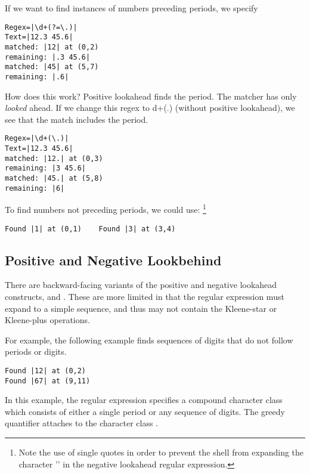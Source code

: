 If we want to find instances of numbers preceding periods, we specify
%
\begin{verbatim}
Regex=|\d+(?=\.)|
Text=|12.3 45.6|
matched: |12| at (0,2)
remaining: |.3 45.6|
matched: |45| at (5,7)
remaining: |.6|
\end{verbatim}
%
How does this work?
Positive lookahead finds the period.  The matcher has only \emph{looked} ahead.
If we change this regex to \code{\bk}d+({\bk}.) (without positive lookahead),
we see that the match includes the period.
%
\begin{verbatim}
Regex=|\d+(\.)|
Text=|12.3 45.6|
matched: |12.| at (0,3)
remaining: |3 45.6|
matched: |45.| at (5,8)
remaining: |6|
\end{verbatim}

To find numbers not preceding periods, we could use:%
%
\footnote{Note the use of single quotes in order to prevent the shell from expanding the character '\code{!}' in the negative lookahead regular expression.}
%
%
\begin{verbatim}
Found |1| at (0,1)    Found |3| at (3,4)
\end{verbatim}

\subsection{Positive and Negative Lookbehind}\label{section:regex-lookbehind}

There are backward-facing variants of the positive and negative
lookahead constructs,  and 
.  These are more limited in that the
regular expression  must expand to a simple sequence, and
thus may not contain the Kleene-star or Kleene-plus operations.

For example, the following example finds sequences of digits that do
not follow periods or digits.
%
\begin{verbatim} 
Found |12| at (0,2)
Found |67| at (9,11)
\end{verbatim}
%
In this example, the regular expression specifies a compound character class
which consists of either a single period or any sequence of digits.
The greedy quantifier \code{+} attaches to the character class .

